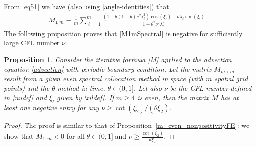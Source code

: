 \documentclass[smallextended,numbook,runningheads]{svjour3}     %
\newtheorem{proposition}{Proposition}
\newtheorem{proposition}{Proposition}
\newcommand{\rr}{\mathbb{R}}
\begin{document}
\begin{description}[style=unboxed,leftmargin=0cm]
\item [{Case 1:} $m$ is {even}.]
From \eqref{eq51} we have (also using \eqref{angle-identities}) that
\begin{align}\label{M1mSpectral}
	M_{1,m} = \frac{1}{m} \sum_{\ell=1}^{m} \frac{\left(1-\theta(1-\theta)\nu^2\lambda_\ell^2\right)
	\cos(\xi_\ell) - \nu\lambda_\ell\sin(\xi_\ell)}{1+\theta^2\nu^2\lambda_\ell^2}.
\end{align}
The following proposition proves that \eqref{M1mSpectral} is negative for sufficiently large CFL number $\nu$.
\begin{proposition}\label{m_even_nonpositivitySpectral}
	Consider the iterative formula \eqref{M} applied to the advection equation \eqref{advection} with periodic
	boundary condition.
	Let the matrix $M_{m \times m}$ result from a given even spactral collocation method in space (with $m$
	spatial grid points) and the $\theta$-method in time, $\theta \in (0,1]$.
	Let also $\nu$ be the CFL number defined in \eqref{nudef} and $\xi_\ell$ given by \eqref{xildef}.
	If $m \ge 4$ is \emph{even}, then the matrix $M$ has at least one negative entry for any
	$\nu \ge \cot(\xi_2)/(\theta \xi_2)$.
\end{proposition}
\begin{proof}
	The proof is similar to that of Proposition~\ref{m_even_nonpositivityFE}: we show that
	$M_{1,m}<0$ for all $\theta \in (0,1]$ and $\nu \ge \frac{\cot(\xi_2)}{\theta \xi_2}$.
	

\end{proof}
\end{description}
\end{document}
